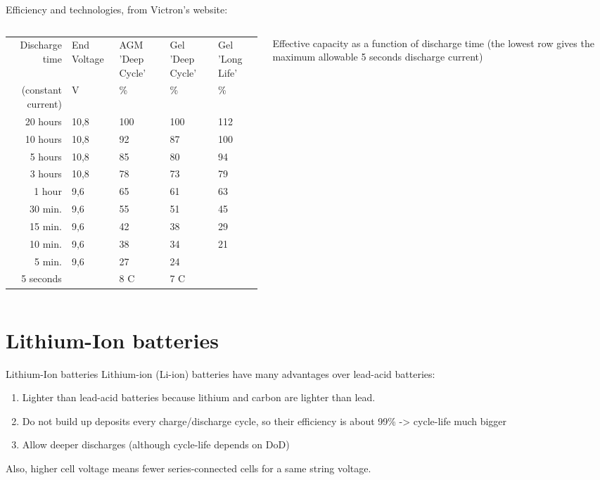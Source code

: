 \begin{frame}[allowframebreaks]{Efficiency and technologies, from Victron's website:}
\begin{columns}
  \begin{column}{0.6\textwidth}
    {\footnotesize
  \begin{tabularx}{\textwidth}{rXXXX}
  \toprule
  Discharge time & End Voltage & AGM 'Deep Cycle' & Gel 'Deep Cycle' & Gel 'Long Life' \\
  (constant current) & V & \% & \% & \% \\
  \midrule
  20 hours & 10,8 & 100 & 100 & 112 \\
  10 hours & 10,8 & 92 & 87 & 100 \\
  5 hours & 10,8 & 85 & 80 & 94 \\
  3 hours & 10,8 & 78 & 73 & 79 \\
  1 hour & 9,6 & 65 & 61 & 63 \\
  30 min. & 9,6 & 55 & 51 & 45 \\
  15 min. & 9,6 & 42 & 38 & 29 \\
  10 min. & 9,6 & 38 & 34 & 21 \\
  5 min. & 9,6 & 27 & 24 &  \\
  5 seconds &  & 8 C & 7 C &  \\
  \bottomrule
\end{tabularx}}
  \end{column}
  \begin{column}{0.35\textwidth}
    Effective capacity as a function of discharge time (the lowest row gives the maximum allowable 5 seconds discharge current)
  \end{column}
\end{columns}


\end{frame}

\section{Lithium-Ion batteries}
\begin{frame}{Lithium-Ion batteries}
Lithium-ion (Li-ion) batteries have many advantages over lead-acid batteries:

\begin{enumerate}
  \item Lighter than lead-acid batteries because lithium and carbon are lighter than lead.
  \item Do not build up deposits every charge/discharge cycle, so their efficiency is about 99\% -> cycle-life much bigger
  \item Allow deeper discharges (although cycle-life depends on DoD)
\end{enumerate}

Also, higher cell voltage means fewer series-connected cells for a same string voltage.

\end{frame}

